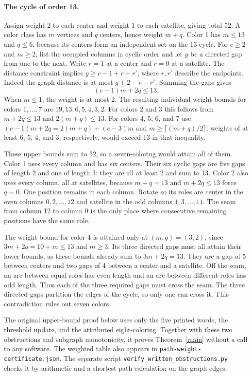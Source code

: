 \documentclass[11pt]{article}
\begin{document}
\paragraph{The cycle of order 13.} Assign weight 2 to each center and weight 1 to each satellite, giving total \(52\). A color class has \(m\) vertices and \(q\) centers, hence weight \(m+q\). Color 1 has \(m\le13\) and \(q\le6\), because its centers form an independent set on the 13-cycle. For \(c\ge2\) and \(m\ge2\), list the occupied columns in cyclic order and let \(g\) be a directed gap from one to the next. Write \(r=1\) at a center and \(r=0\) at a satellite. The distance constraint implies \(g\ge c-1+r+r'\), where \(r,r'\) describe the endpoints. Indeed the graph distance is at most \(g+2-r-r'\). Summing the gaps gives
\[
(c-1)m+2q\le 13.
\]
When \(m\le1\), the weight is at most 2. The resulting individual weight bounds for colors \(1,\ldots,7\) are \(19,13,6,5,4,3,2\). For colors 2 and 3 this follows from \(m+2q\le13\) and \(2(m+q)\le13\). For colors 4, 5, 6, and 7 use \((c-1)m+2q=2(m+q)+(c-3)m\) and \(m\ge\lceil(m+q)/2\rceil\); weights of at least 6, 5, 4, and 3, respectively, would exceed 13 in that inequality.

These upper bounds sum to 52, so a seven-coloring would attain all of them. Color 1 uses every column and has six centers. Their six cyclic gaps are five gaps of length 2 and one of length 3: they are all at least 2 and sum to 13. Color 2 also uses every column, all at satellites, because \(m+q=13\) and \(m+2q\le13\) force \(q=0\). One position remains in each column. Rotate so its roles are center in the even columns \(0,2,\ldots,12\) and satellite in the odd columns \(1,3,\ldots,11\). The seam from column 12 to column 0 is the only place where consecutive remaining positions have the same role.

The weight bound for color 4 is attained only at \((m,q)=(3,2)\), since \(3m+2q=10+m\le13\) and \(m\ge3\). Its three directed gaps must all attain their lower bounds, as these bounds already sum to \(3m+2q=13\). They are a gap of 5 between centers and two gaps of 4 between a center and a satellite. Off the seam, an arc between equal roles has even length and an arc between different roles has odd length. Thus each of the three required gaps must cross the seam. The three directed gaps partition the edges of the cycle, so only one can cross it. This contradiction rules out seven colors.

The original upper-bound proof below uses only the five printed words, the threshold update, and the attributed eight-coloring. Together with these two obstructions and subgraph monotonicity, it proves Theorem~\ref{main} without a call to any software. The weighted table also appears in \texttt{path-weight-certificate.json}. The separate script \texttt{verify\_written\_obstructions.py} checks it by arithmetic and a shortest-path calculation on the graph edges.
\end{document}
